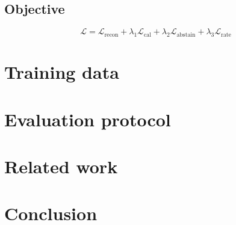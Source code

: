 \documentclass{article}
\begin{document}
\subsection{Objective}
\begin{equation}
\mathcal{L} = \mathcal{L}_{\text{recon}}
            + \lambda_1 \mathcal{L}_{\text{cal}}
            + \lambda_2 \mathcal{L}_{\text{abstain}}
            + \lambda_3 \mathcal{L}_{\text{rate}}
\label{eq:loss}
\end{equation}

\section{Training data}
\label{sec:data}

%
%

\section{Evaluation protocol}
\label{sec:eval}


\section{Related work}
\label{sec:related}


\section{Conclusion}
\label{sec:conclusion}



\end{document}
